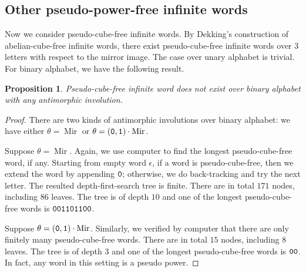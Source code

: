 \documentclass[12pt]{article}
\def\mirror{{\operatorname{Mir}}}
\def\mtt#1{{\tt #1}}
\newtheorem{proposition}[theorem]{Proposition}
\begin{document}
\subsection{Other pseudo-power-free infinite words}
Now we consider pseudo-cube-free infinite words. By Dekking's
construction of abelian-cube-free infinite words, there exist
pseudo-cube-free infinite words over $3$ letters with respect to the
mirror image. The case over unary alphabet is trivial. For binary
alphabet, we have the following result.


\begin{proposition}\label{prop:pseudocube}
Pseudo-cube-free infinite word does not exist over binary alphabet
with any antimorphic involution.
\end{proposition}
\begin{proof}
There are two kinds of antimorphic involutions over binary alphabet:
we have either $\theta=\mirror$ or
$\theta=(\mtt0,\mtt1)\cdot\mirror$.

Suppose $\theta=\mirror$. Again, we use computer to find the longest
pseudo-cube-free word, if any. Starting from empty word $\epsilon$,
if a word is pseudo-cube-free, then we extend the word by appending
$\mtt0$; otherwise, we do back-tracking and try the next letter. The
resulted depth-first-search tree is finite. There are in total $171$
nodes, including $86$ leaves. The tree is of depth $10$ and one of
the longest pseudo-cube-free words is
$\mtt0\mtt0\mtt1\mtt1\mtt0\mtt1\mtt1\mtt0\mtt0$.

Suppose $\theta=(\mtt0,\mtt1)\cdot\mirror$. Similarly, we verified
by computer that there are only finitely many pseudo-cube-free
words. There are in total $15$ nodes, including $8$ leaves. The tree
is of depth $3$ and one of the longest pseudo-cube-free words is
$\mtt0\mtt0$. In fact, any word in this setting is a pseudo power.
\end{proof}
\end{document}
